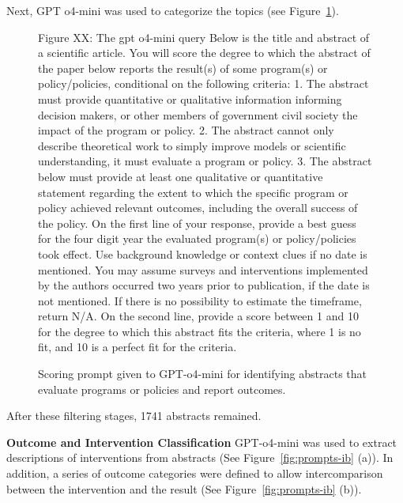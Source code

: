 \documentclass[12pt,a4paper]{article}
\begin{document}
Next, GPT o4-mini was used to categorize the topics (see Figure~\ref{fig:o4mini-scorer}).

\begin{figure}[htbp]
  \centering
  \begin{tcolorbox}[left=4pt, right=4pt, top=4pt, bottom=4pt]
\ttfamily\footnotesize
Figure XX: The gpt o4-mini query
Below is the title and abstract of a scientific article. 
You will score the degree to which the abstract of the paper below reports the result(s) of some program(s) or policy/policies, conditional on the following criteria: 
 1. The abstract must provide quantitative or qualitative information informing decision makers, or other members of government civil society the impact of the program or policy. 
 2. The abstract cannot only describe theoretical work to simply improve models or scientific understanding, it must evaluate a program or policy. 
 3. The abstract below must provide at least one qualitative or quantitative statement regarding the extent to which the specific program or policy achieved relevant outcomes, including the overall success of the policy.  
On the first line of your response, provide a best guess for the four digit year the evaluated program(s) or policy/policies took effect. Use background knowledge or context clues if no date is mentioned. You may assume surveys and interventions implemented by the authors occurred two years prior to publication, if the date is not mentioned. If there is no possibility to estimate the timeframe, return N/A.
On the second line, provide a score between 1 and 10 for the degree to which this abstract fits the criteria, where 1 is no fit, and 10 is a perfect fit for the criteria.
  \end{tcolorbox}
  \caption{Scoring prompt given to GPT-o4-mini for identifying abstracts that evaluate programs or policies and report outcomes.}
  \label{fig:o4mini-scorer}
\end{figure}

After these filtering stages, 1741 abstracts remained.

\textbf{Outcome and Intervention Classification}
GPT-o4-mini was used to extract descriptions of interventions from abstracts (See Figure~\ref{fig:prompts-ib} (a)). In addition, a series of outcome categories were defined to allow intercomparison between the intervention and the result (See Figure~\ref{fig:prompts-ib} (b)). 
\end{document}
